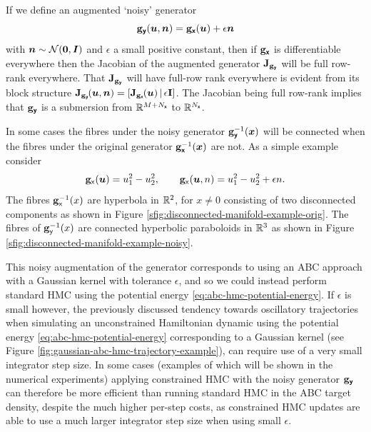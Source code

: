 If we define an augmented `noisy' generator
\begin{equation}
  {\mathbf{g}}_{\boldsymbol{\mathsf{y}}}(\boldsymbol{u},\boldsymbol{n}) = {\mathbf{g}}_{\boldsymbol{\mathsf{x}}}(\boldsymbol{u}) + \epsilon \boldsymbol{n}
\end{equation}
with $\vct{n} \sim \nrm{\vct{0},\mtx{I}}$ and $\epsilon$ a small positive constant, then if ${\mathbf{g}}_{\boldsymbol{\mathsf{x}}}$ is differentiable everywhere then the Jacobian of the augmented generator $\mathbf{J}_{{\mathbf{g}}_{\boldsymbol{\mathsf{y}}}}$ will be full row-rank everywhere. That $\mathbf{J}_{{\mathbf{g}}_{\boldsymbol{\mathsf{y}}}}$ will have full-row rank everywhere is evident from its block structure $\jacob{\genfunc_{\rvct{y}}}{\vct{u},\vct{n}} = \lsb \jacob{\genfunc_{\rvct{x}}}{\vct{u}} \,\middle|\, \epsilon\idmtx \rsb$. The Jacobian being full row-rank implies that ${\mathbf{g}}_{\boldsymbol{\mathsf{y}}}$ is a submersion from $\mathbb{R}^{M + N_{\boldsymbol{\mathsf{x}}}}$ to $\mathbb{R}^{N_{\boldsymbol{\mathsf{x}}}}$.%

In some cases the fibres under the noisy generator ${\mathbf{g}}_{\boldsymbol{\mathsf{y}}}^{-1}(\boldsymbol{x})$ will be connected when the fibres under the original generator ${\mathbf{g}}_{\boldsymbol{\mathsf{x}}}^{-1}(\boldsymbol{x})$ are not. As a simple example consider
\begin{equation}\label{eq:disconnected-manifold-example}
  {\mathbf{g}}_{\mathsf{x}}(\boldsymbol{u}) = u_1^2 - u_2^2,
  \qquad
  {\mathbf{g}}_{\mathsf{x}}(\boldsymbol{u}, n) = u_1^2 - u_2^2 + \epsilon n.
\end{equation}
The fibres ${\mathbf{g}}_{\mathsf{x}}^{-1}(x)$ are hyperbola in $\mathbb{R}^2$, for $x \neq 0$ consisting of two disconnected components as shown in Figure \ref{sfig:disconnected-manifold-example-orig}. The fibres of ${\mathbf{g}}_{\mathsf{y}}^{-1}(x)$ are connected hyperbolic paraboloids in $\mathbb{R}^3$ as shown in Figure \ref{sfig:disconnected-manifold-example-noisy}.

This noisy augmentation of the generator corresponds to using an \ac{ABC} approach with a Gaussian kernel with tolerance $\epsilon$, and so we could instead perform standard \ac{HMC} using the potential energy \eqref{eq:abc-hmc-potential-energy}. If $\epsilon$ is small however, the previously discussed tendency towards oscillatory trajectories when simulating an unconstrained Hamiltonian dynamic using the potential energy \eqref{eq:abc-hmc-potential-energy} corresponding to a Gaussian kernel (see Figure \ref{fig:gaussian-abc-hmc-trajectory-example}), can require use of a very small integrator step size. In some cases (examples of which will be shown in the numerical experiments) applying constrained \ac{HMC} with the noisy generator ${\mathbf{g}}_{\boldsymbol{\mathsf{y}}}$ can therefore be more efficient than running standard \ac{HMC} in the \ac{ABC} target density, despite the much higher per-step costs, as constrained \ac{HMC} updates are able to use a much larger integrator step size when using small $\epsilon$. 

